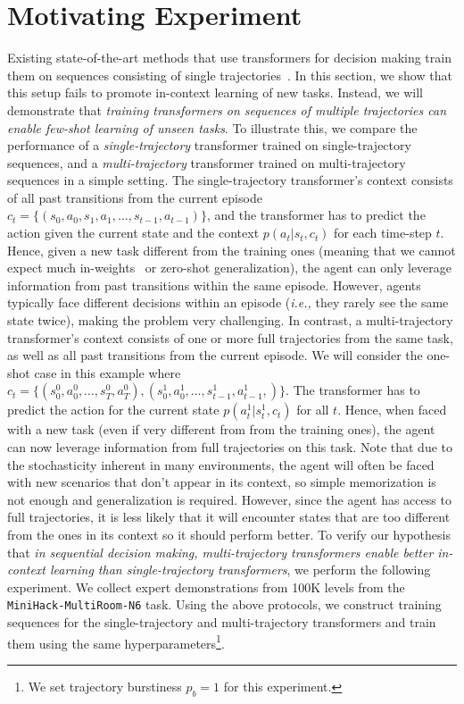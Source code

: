 \documentclass[]{fairmeta}
\newcommand{\ie}{\textit{i.e.,}}
\begin{document}
\section{Motivating Experiment}
Existing state-of-the-art methods that use transformers for decision making train them on sequences consisting of single trajectories~\citep{decision_transformer}. In this section, we show that this setup fails to promote in-context learning of new tasks. Instead, we will demonstrate that \textit{training transformers on sequences of multiple trajectories can enable few-shot learning of unseen tasks}. To illustrate this, we compare the performance of a \textit{single-trajectory} transformer trained on single-trajectory sequences, and a \textit{multi-trajectory} transformer trained on multi-trajectory sequences in a simple setting.
The single-trajectory transformer's context consists of all past transitions from the current episode $c_t = \{(s_0, a_0, s_1, a_1, \ldots, s_{t-1}, a_{t-1})\}$, and the transformer has to predict the action given the current state and the context $p(a_t | s_t, c_t)$ for each time-step $t$. Hence, given a new task different from the training ones (meaning that we cannot expect much in-weights~\citep{chen2022transdreamer} or zero-shot generalization), the agent can only leverage information from past transitions within the same episode. However, agents typically face different decisions within an episode (\ie{} they rarely see the same state twice), making the problem very challenging.
In contrast, a multi-trajectory transformer's context consists of one or more full trajectories from the same task, as well as all past transitions from the current episode. We will consider the one-shot case in this example where $c_t = \{(s_0^0, a_0^0, \ldots, s_{T}^0, a_{T}^0), (s_0^1, a_0^1, \ldots, s_{t-1}^1, a_{t-1}^1, )\}$. The transformer has to predict the action for the current state $p(a_t^1 | s_t^1, c_t)$ for all $t$.
Hence, when faced with a new task (even if very different from from the training ones), the agent can now leverage information from full trajectories on this task. Note that due to the stochasticity inherent in many environments,  the agent will often be faced with new scenarios that don't appear in its context, so simple memorization is not enough and generalization is required.
However, since the agent has access to full trajectories, it is less likely that it will encounter states that are too different from the ones in its context so it should perform better.
To verify our hypothesis that \textit{in sequential decision making, multi-trajectory transformers enable better in-context learning than single-trajectory transformers}, we perform the following experiment. We collect expert demonstrations from 100K levels from the \texttt{MiniHack-MultiRoom-N6} task. Using the above protocols, we construct training sequences for the single-trajectory and multi-trajectory transformers and train them using the same hyperparameters\footnote{We set trajectory burstiness $p_b = 1$ for this experiment.}.
\end{document}

